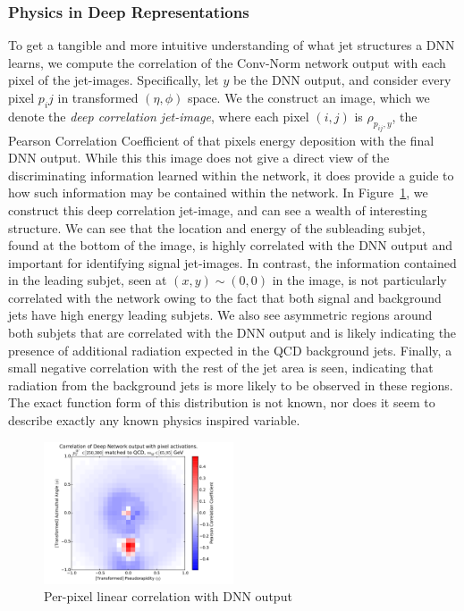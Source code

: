 \subsubsection{Physics in Deep Representations} %
\label{ssub:physics_in_deep_representations}
To get a tangible and more intuitive understanding of what jet structures a DNN learns, we compute the correlation of the Conv-Norm network output with each pixel of the jet-images. Specifically, let $y$ be the DNN output, and consider every pixel $p_ij$ in transformed $(\eta, \phi)$ space. We the construct an image, which we denote the \emph{deep correlation jet-image}, where each pixel $(i, j)$ is $\rho_{p_{ij}, y}$, the Pearson Correlation Coefficient of that pixels energy deposition with the final DNN output. While this this image does not give a direct view of the discriminating information learned within the network, it does provide a guide to how such information may be contained within the network.  In Figure~\ref{fig:corr}, we construct this deep correlation jet-image, and can see a wealth of interesting structure.  We can see that the location and energy of the subleading subjet, found at the bottom of the image, is highly correlated with the DNN output and important for identifying signal jet-images.  In contrast, the information contained in the leading subjet, seen at $(x,y)\sim (0,0)$ in the image, is not particularly correlated with the network owing to the fact that both signal and background jets have high energy leading subjets.  We also see asymmetric regions around both subjets that are correlated with the DNN output and is likely indicating the presence of additional radiation expected in the QCD background jets.  Finally, a small negative correlation with the rest of the jet area is seen, indicating that radiation from the background jets is more likely to be observed in these regions.   The exact function form of this distribution is not known, nor does it seem to describe exactly any known physics inspired variable.
\begin{figure}[!htbp]
  \centering
  \includegraphics[width=0.5\textwidth]{figures/pixel-activations-corr.pdf}
  \caption{Per-pixel linear correlation with DNN output}
  \label{fig:corr}
\end{figure}


